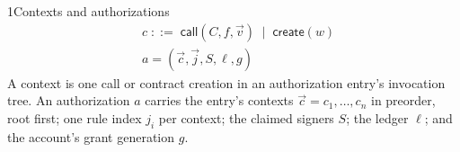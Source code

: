 \begin{perchdefinition}{1}{Contexts and authorizations}\label{def:contexts-and-authorizations}
\[\begin{aligned}&c \;::=\; \mathsf{call}(C, f, \vec v) \;\mid\; \mathsf{create}(w)\\
&a = (\vec c, \vec j, S, \ell, g)\end{aligned}\]
A context is one call or contract creation in an authorization entry's invocation tree. An authorization \(a\) carries the entry's contexts \(\vec c = c_1, \dots, c_n\) in preorder, root first; one rule index \(j_i\) per context; the claimed signers \(S\); the ledger \(\ell\); and the account's grant generation \(g\).
\end{perchdefinition}
